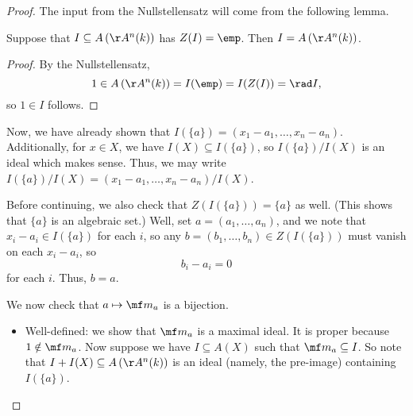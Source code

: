 \begin{proof}
	The input from the Nullstellensatz will come from the following lemma.
	\begin{lemma} \label{lem:zeroempty}
		Suppose that $I\subseteq A\left(\AA^n(k)\right)$ has $Z(I)=\emp$. Then $I=A\left(\AA^n(k)\right)$.
	\end{lemma}
	\begin{proof}
		By the Nullstellensatz,
		\[1\in A\left(\AA^n(k)\right)=I(\emp)=I(Z(I))=\rad I,\]
		so $1\in I$ follows.
	\end{proof}
	Now, we have already shown that $I(\{a\})=(x_1-a_1,\ldots,x_n-a_n)$. Additionally, for $x\in X$, we have $I(X)\subseteq I(\{a\})$, so $I(\{a\})/I(X)$ is an ideal which makes sense. Thus, we may write $I(\{a\})/I(X)=(x_1-a_1,\ldots,x_n-a_n)/I(X)$.
	
	Before continuing, we also check that $Z(I(\{a\}))=\{a\}$ as well. (This shows that $\{a\}$ is an algebraic set.) Well, set $a=(a_1,\ldots,a_n)$, and we note that $x_i-a_i\in I(\{a\})$ for each $i$, so any $b=(b_1,\ldots,b_n)\in Z(I(\{a\}))$ must vanish on each $x_i-a_i$, so
	\[b_i-a_i=0\]
	for each $i$. Thus, $b=a$.

	We now check that $a\mapsto\mf m_a$ is a bijection.
	\begin{itemize}
		\item Well-defined: we show that $\mf m_a$ is a maximal ideal. It is proper because $1\notin\mf m_a$. Now suppose we have $I\subseteq A(X)$ such that $\mf m_a\subseteq I$. So note that $I+I(X)\subseteq A\left(\AA^n(k)\right)$ is an ideal (namely, the pre-image) containing $I(\{a\})$.


\end{itemize}
\end{proof}
